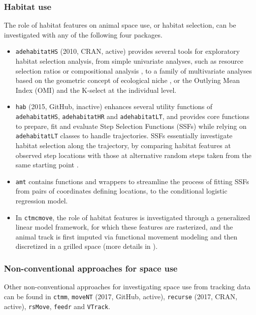 \documentclass[a4paper,12pt]{article}
\newcommand{\Rpkg}[1]{\texttt{#1}}
\begin{document}
\subsubsection*{Habitat use}

The role of habitat features on animal space use, or habitat selection, can be investigated with any of the following four packages. 

\begin{itemize}
        \item \Rpkg{adehabitatHS} (2010, CRAN, active) provides several tools for exploratory habitat selection analysis, from simple univariate analyses, such as resource selection ratios \citep{Manly2007} or compositional analysis \citep{Aebischer1993}, to a family of multivariate analyses based on the geometric concept of ecological niche \citep{Hutchinson1957}, or the Outlying Mean Index (OMI) \citep{Doledec2000} and the K-select \citep{Calenge2005} at the individual level.
        \item \Rpkg{hab} (2015, GitHub, inactive) enhances several utility functions of \Rpkg{adehabitatHS}, \Rpkg{adehabitatHR} and \Rpkg{adehabitatLT}, and provides core functions to prepare, fit and evaluate Step Selection Functions (SSFs) \citep{Fortin2005} while relying on \Rpkg{adehabitatLT} classes to handle trajectories. SSFs essentially investigate habitat selection along the trajectory, by comparing habitat features at observed step locations with those at alternative random steps taken from the same starting point \citep{Thurfjell2014}.
        \item \Rpkg{amt} contains functions and wrappers to streamline the process of fitting SSFs from pairs of coordinates defining locations, to the conditional logistic regression model.
        \item In \Rpkg{ctmcmove}, the role of habitat features is investigated through a generalized linear model framework, for which these features are rasterized, and the animal track is first imputed via functional movement modeling and then discretized in a grilled space (more details in \cite{Hanks2015}). 
\end{itemize}

\subsubsection*{Non-conventional approaches for space use}

Other non-conventional approaches for investigating space use from tracking data can be found in \Rpkg{ctmm}, \Rpkg{moveNT} (2017, GitHub, active), \Rpkg{recurse} (2017, CRAN, active), \Rpkg{rsMove}, \Rpkg{feedr} and \Rpkg{VTrack}. 
\end{document}
